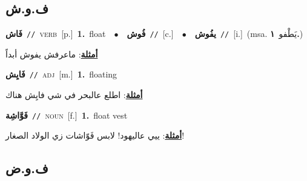 \documentclass[10pt,a4paper,twoside]{article} %
\begin{document}
\begin{multicols}{2}
\vspace{-3mm}
\subsection*{\color{blue}\foreignlanguage{arabic}{ف.و.ش}\color{blue}{}} 

{\setlength\topsep{0pt}\textbf{\foreignlanguage{arabic}{فَاش}}\ {\color{gray}\texttt{//}\color{black}}\ \textsc{verb}\ [p.]\ \textbf{1.}~float\ \ $\bullet$\ \ \setlength\topsep{0pt}\textbf{\foreignlanguage{arabic}{فُوش}}\ {\color{gray}\texttt{//}\color{black}}\ [c.]\ \ $\bullet$\ \ \setlength\topsep{0pt}\textbf{\foreignlanguage{arabic}{يفُوش}}\ {\color{gray}\texttt{//}\color{black}}\ [i.]\ \color{gray}(msa. \foreignlanguage{arabic}{يَطْفو}~\foreignlanguage{arabic}{\textbf{١.}})\color{black}\  \begin{flushright}\color{gray}\foreignlanguage{arabic}{\textbf{\underline{\foreignlanguage{arabic}{أمثلة}}}: ماعرفش يفوش أبداً}\end{flushright}\color{black}} \vspace{2mm}

{\setlength\topsep{0pt}\textbf{\foreignlanguage{arabic}{فَايِش}}\ {\color{gray}\texttt{//}\color{black}}\ \textsc{adj}\ [m.]\ \textbf{1.}~floating\  \begin{flushright}\color{gray}\foreignlanguage{arabic}{\textbf{\underline{\foreignlanguage{arabic}{أمثلة}}}: اطلع عالبحر في شي فايِش هناك}\end{flushright}\color{black}} \vspace{2mm}

{\setlength\topsep{0pt}\textbf{\foreignlanguage{arabic}{فَوَّاشِة}}\ {\color{gray}\texttt{//}\color{black}}\ \textsc{noun}\ [f.]\ \textbf{1.}~float vest\  \begin{flushright}\color{gray}\foreignlanguage{arabic}{\textbf{\underline{\foreignlanguage{arabic}{أمثلة}}}: ييي عاليهود! لابس فَوّاشات زي الولاد الصغار!}\end{flushright}\color{black}} \vspace{2mm}

\vspace{-3mm}
\subsection*{\color{blue}\foreignlanguage{arabic}{ف.و.ض}\color{blue}{}} 


\end{multicols}
\end{document}
